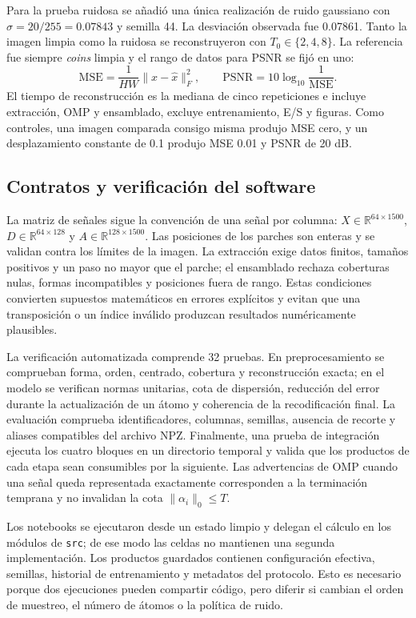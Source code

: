 \documentclass[conference]{IEEEtran}
\begin{document}
Para la prueba ruidosa se añadió una única realización de ruido gaussiano con $\sigma=20/255=0.07843$ y semilla 44. La desviación observada fue 0.07861. Tanto la imagen limpia como la ruidosa se reconstruyeron con $T_0\in\{2,4,8\}$. La referencia fue siempre \emph{coins} limpia y el rango de datos para PSNR se fijó en uno:
\begin{equation}
 \mathrm{MSE}=\frac{1}{HW}\|x-\widehat x\|_F^2,\qquad
 \mathrm{PSNR}=10\log_{10}\frac{1}{\mathrm{MSE}}.
\end{equation}
El tiempo de reconstrucción es la mediana de cinco repeticiones e incluye extracción, OMP y ensamblado, excluye entrenamiento, E/S y figuras. Como controles, una imagen comparada consigo misma produjo MSE cero, y un desplazamiento constante de 0.1 produjo MSE 0.01 y PSNR de 20 dB.

\subsection{Contratos y verificación del software}
La matriz de señales sigue la convención de una señal por columna: $X\in\mathbb{R}^{64\times1500}$, $D\in\mathbb{R}^{64\times128}$ y $A\in\mathbb{R}^{128\times1500}$. Las posiciones de los parches son enteras y se validan contra los límites de la imagen. La extracción exige datos finitos, tamaños positivos y un paso no mayor que el parche; el ensamblado rechaza coberturas nulas, formas incompatibles y posiciones fuera de rango. Estas condiciones convierten supuestos matemáticos en errores explícitos y evitan que una transposición o un índice inválido produzcan resultados numéricamente plausibles.

La verificación automatizada comprende 32 pruebas. En preprocesamiento se comprueban forma, orden, centrado, cobertura y reconstrucción exacta; en el modelo se verifican normas unitarias, cota de dispersión, reducción del error durante la actualización de un átomo y coherencia de la recodificación final. La evaluación comprueba identificadores, columnas, semillas, ausencia de recorte y aliases compatibles del archivo NPZ. Finalmente, una prueba de integración ejecuta los cuatro bloques en un directorio temporal y valida que los productos de cada etapa sean consumibles por la siguiente. Las advertencias de OMP cuando una señal queda representada exactamente corresponden a la terminación temprana y no invalidan la cota $\|\alpha_i\|_0\leq T$.

Los notebooks se ejecutaron desde un estado limpio y delegan el cálculo en los módulos de \texttt{src}; de ese modo las celdas no mantienen una segunda implementación. Los productos guardados contienen configuración efectiva, semillas, historial de entrenamiento y metadatos del protocolo. Esto es necesario porque dos ejecuciones pueden compartir código, pero diferir si cambian el orden de muestreo, el número de átomos o la política de ruido.
\end{document}
